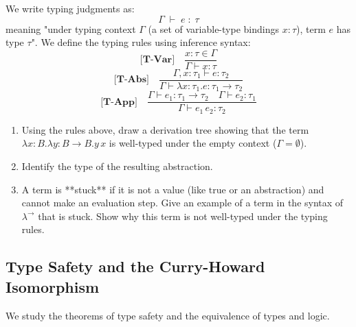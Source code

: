 \documentclass[12pt, a4paper]{book}
\begin{document}
\begin{explobox}
We write typing judgments as:
\[
  \Gamma \;\vdash\; e \;:\; \tau
\]
meaning "under typing context $\Gamma$ (a set of variable-type bindings $x:\tau$), term $e$ has type $\tau$".
We define the typing rules using inference syntax:
\[
  \textbf{[T-Var]} \quad \frac{x : \tau \in \Gamma}{\Gamma \vdash x : \tau}
\]
\[
  \textbf{[T-Abs]} \quad \frac{\Gamma, x : \tau_1 \vdash e : \tau_2}{\Gamma \vdash \lambda x : \tau_1. e : \tau_1 \to \tau_2}
\]
\[
  \textbf{[T-App]} \quad \frac{\Gamma \vdash e_1 : \tau_1 \to \tau_2 \quad \Gamma \vdash e_2 : \tau_1}{\Gamma \vdash e_1 \, e_2 : \tau_2}
\]
\begin{enumerate}[label=(\alph*), leftmargin=*]
  \item Using the rules above, draw a derivation tree showing that the term $\lambda x : B. \lambda y : B \to B. y \, x$ is well-typed under the empty context ($\Gamma = \emptyset$).
  \item Identify the type of the resulting abstraction.
  \item A term is **stuck** if it is not a value (like $\text{true}$ or an abstraction) and cannot make an evaluation step.
        Give an example of a term in the syntax of $\lambda^\to$ that is stuck. Show why this term is not well-typed under the typing rules.
\end{enumerate}
\end{explobox}

\subsection{Type Safety and the Curry-Howard Isomorphism}

We study the theorems of type safety and the equivalence of types and logic.
\end{document}
